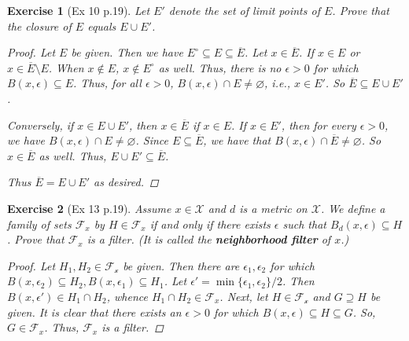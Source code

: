 \documentclass[11pt]{article}
\newtheorem{exercise}{Exercise}
\begin{document}
\begin{exercise}[Ex 10 p.19]
	Let $E'$ denote the set of limit points of $E$. Prove that the closure of $E$ equals $E\cup E'$.
	\begin{proof}
		Let $E$ be given. Then we have $E^\circ \subseteq E \subseteq \overline{E}$. Let $x\in \overline{E}$. If $x\in E$ or $x\in \overline{E}\setminus E$. When $x\notin E$, $x\notin E^\circ$ as well. Thus, there is no $\epsilon > 0$ for which $B(x,\epsilon) \subseteq E$. Thus, for all $\epsilon > 0$, $B(x,\epsilon)\cap E \neq \varnothing$, i.e., $x\in E' $. So $\overline{E} \subseteq E \cup E'$. 
		
		Conversely, if $x\in E\cup E'$, then $x\in \overline{E}$ if $x\in E$. If $x\in E'$, then for every $\epsilon >0$, we have $B(x,\epsilon) \cap E \neq \varnothing$. Since $E\subseteq \overline{E}$, we have that $B(x,\epsilon)\cap \overline{E} \neq \varnothing$. So $x\in \overline{E}$ as well. Thus, $E\cup E' \subseteq \overline{E}$. 
		
		Thus $\overline{E} = E \cup E'$ as desired.   
	\end{proof}
\end{exercise}

\begin{exercise}[Ex 13 p.19]
	Assume $x\in \mathcal{X}$ and $d$ is a metric on $\mathcal{X}$. We define a family of sets $\mathcal{F}_x$ by $H \in \mathcal{F}_x$ if and only if there exists $\epsilon$ such that $B_d(x, \epsilon) \subseteq H$. Prove that $\mathcal{F}_x$ is a filter. (It is called the \textbf{neighborhood filter} of $x$.)
	\begin{proof}
		Let $H_1, H_2\in \mathcal{F_x}$ be given. Then there are $\epsilon_1,\epsilon_2$ for which $B(x,\epsilon_2)\subseteq H_2, B(x,\epsilon_1)\subseteq H_1$. Let $\epsilon' = \min\{\epsilon_1,\epsilon_2\}/2$. Then $B(x,\epsilon') \in H_1\cap H_2$, whence $H_1\cap H_2 \in \mathcal{F}_x$. Next, let $H\in \mathcal{F_x}$ and $G \supseteq H$ be given. It is clear that there exists an $\epsilon >0$ for which $B(x,\epsilon)\subseteq H \subseteq G$. So, $G\in \mathcal{F}_x$. Thus, $\mathcal{F}_x$ is a filter.
	\end{proof}
\end{exercise}
\end{document}
